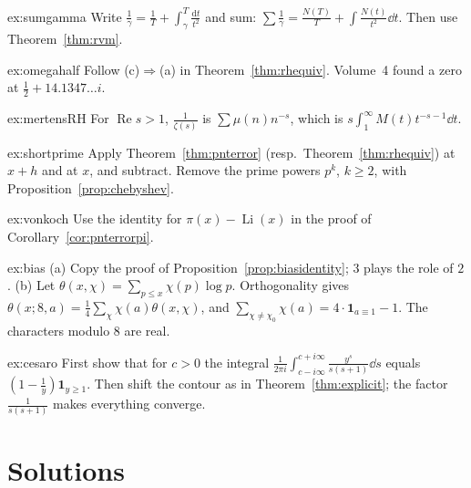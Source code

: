 \begin{hint}{ex:sumgamma}
Write $\frac1\gamma=\frac1T+\int_\gamma^T\frac{\mathrm dt}{t^2}$ and sum: $\sum\frac1\gamma=\frac{N(T)}T+\int\frac{N(t)}{t^2}\dd t$. Then use Theorem~\ref{thm:rvm}.
\end{hint}
\begin{hint}{ex:omegahalf}
Follow (c)$\Rightarrow$(a) in Theorem~\ref{thm:rhequiv}. Volume~4 found a zero at $\frac12+14.1347\ldots i$.
\end{hint}
\begin{hint}{ex:mertensRH}
For $\operatorname{Re}s>1$, $\frac1{\zeta(s)}$ is $\sum\mu(n)n^{-s}$, which is $s\int_1^\infty M(t)t^{-s-1}\dd t$.
\end{hint}
\begin{hint}{ex:shortprime}
Apply Theorem~\ref{thm:pnterror} (resp.\ Theorem~\ref{thm:rhequiv}) at $x+h$ and at $x$, and subtract. Remove the prime powers $p^k$, $k\ge2$, with Proposition~\ref{prop:chebyshev}.
\end{hint}
\begin{hint}{ex:vonkoch}
Use the identity for $\pi(x)-\operatorname{Li}(x)$ in the proof of Corollary~\ref{cor:pnterrorpi}.
\end{hint}
\begin{hint}{ex:bias}
(a) Copy the proof of Proposition~\ref{prop:biasidentity}; $3$ plays the role of $2$. (b) Let $\theta(x,\chi)=\sum_{p\le x}\chi(p)\log p$. Orthogonality gives $\theta(x;8,a)=\frac14\sum_\chi\chi(a)\theta(x,\chi)$, and
$\sum_{\chi\ne\chi_0}\chi(a)=4\cdot\mathbf1_{a\equiv1}-1$. The characters modulo $8$ are real.
\end{hint}
\begin{hint}{ex:cesaro}
First show that for $c>0$ the integral $\frac1{2\pi i}\int_{c-i\infty}^{c+i\infty}\frac{y^s}{s(s+1)}\dd s$ equals $(1-\frac1y)\mathbf1_{y\ge1}$. Then shift the contour as in Theorem~\ref{thm:explicit}; the factor $\frac1{s(s+1)}$ makes everything converge.
\end{hint}

\section{Solutions}

